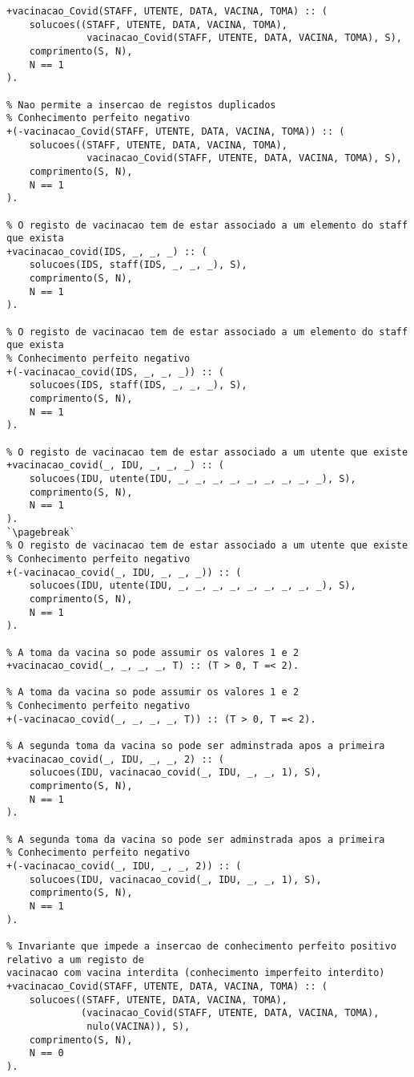 \begin{lstlisting}[caption={Invariantes de inserção relativos ao predicado 
\texttt{vacinacao\_covid}}]
% Nao permite a insercao de registos duplicados
+vacinacao_Covid(STAFF, UTENTE, DATA, VACINA, TOMA) :: (
    solucoes((STAFF, UTENTE, DATA, VACINA, TOMA),
              vacinacao_Covid(STAFF, UTENTE, DATA, VACINA, TOMA), S),
    comprimento(S, N),
    N == 1
).

% Nao permite a insercao de registos duplicados
% Conhecimento perfeito negativo
+(-vacinacao_Covid(STAFF, UTENTE, DATA, VACINA, TOMA)) :: (
    solucoes((STAFF, UTENTE, DATA, VACINA, TOMA),
              vacinacao_Covid(STAFF, UTENTE, DATA, VACINA, TOMA), S),
    comprimento(S, N),
    N == 1
).

% O registo de vacinacao tem de estar associado a um elemento do staff que exista
+vacinacao_covid(IDS, _, _, _) :: (
    solucoes(IDS, staff(IDS, _, _, _), S),
    comprimento(S, N),
    N == 1
).

% O registo de vacinacao tem de estar associado a um elemento do staff que exista
% Conhecimento perfeito negativo
+(-vacinacao_covid(IDS, _, _, _)) :: (
    solucoes(IDS, staff(IDS, _, _, _), S),
    comprimento(S, N),
    N == 1
).

% O registo de vacinacao tem de estar associado a um utente que existe
+vacinacao_covid(_, IDU, _, _, _) :: (
    solucoes(IDU, utente(IDU, _, _, _, _, _, _, _, _, _), S),
    comprimento(S, N),
    N == 1
).
`\pagebreak`
% O registo de vacinacao tem de estar associado a um utente que existe
% Conhecimento perfeito negativo
+(-vacinacao_covid(_, IDU, _, _, _)) :: (
    solucoes(IDU, utente(IDU, _, _, _, _, _, _, _, _, _), S),
    comprimento(S, N),
    N == 1
).

% A toma da vacina so pode assumir os valores 1 e 2
+vacinacao_covid(_, _, _, _, T) :: (T > 0, T =< 2).

% A toma da vacina so pode assumir os valores 1 e 2
% Conhecimento perfeito negativo
+(-vacinacao_covid(_, _, _, _, T)) :: (T > 0, T =< 2).

% A segunda toma da vacina so pode ser adminstrada apos a primeira
+vacinacao_covid(_, IDU, _, _, 2) :: (
    solucoes(IDU, vacinacao_covid(_, IDU, _, _, 1), S),
    comprimento(S, N),
    N == 1
).

% A segunda toma da vacina so pode ser adminstrada apos a primeira
% Conhecimento perfeito negativo
+(-vacinacao_covid(_, IDU, _, _, 2)) :: (
    solucoes(IDU, vacinacao_covid(_, IDU, _, _, 1), S),
    comprimento(S, N),
    N == 1
).

% Invariante que impede a insercao de conhecimento perfeito positivo relativo a um registo de 
vacinacao com vacina interdita (conhecimento imperfeito interdito)
+vacinacao_Covid(STAFF, UTENTE, DATA, VACINA, TOMA) :: (
    solucoes((STAFF, UTENTE, DATA, VACINA, TOMA),
             (vacinacao_Covid(STAFF, UTENTE, DATA, VACINA, TOMA),
              nulo(VACINA)), S),
    comprimento(S, N),
    N == 0
).

\end{lstlisting}

